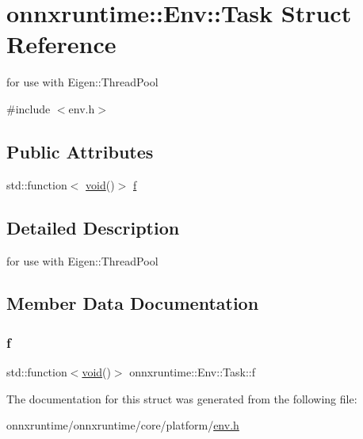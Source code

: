 \hypertarget{structonnxruntime_1_1Env_1_1Task}{}\section{onnxruntime\+:\+:Env\+:\+:Task Struct Reference}
\label{structonnxruntime_1_1Env_1_1Task}


for use with Eigen\+::\+Thread\+Pool  




{\ttfamily \#include $<$env.\+h$>$}

\subsection*{Public Attributes}
\begin{DoxyCompactItemize}
\item 
std\+::function$<$ \mbox{\hyperlink{mlasi_8h_a88f941d423cb2a819b70a1358982b1a6}{void}}()$>$ \mbox{\hyperlink{structonnxruntime_1_1Env_1_1Task_a78dc06820ea629efa348fff0d07c40b1}{f}}
\end{DoxyCompactItemize}


\subsection{Detailed Description}
for use with Eigen\+::\+Thread\+Pool 

\subsection{Member Data Documentation}
\mbox{\label{structonnxruntime_1_1Env_1_1Task_a78dc06820ea629efa348fff0d07c40b1}} 
\subsubsection{\texorpdfstring{f}{f}}
{\footnotesize\ttfamily std\+::function$<$\mbox{\hyperlink{mlasi_8h_a88f941d423cb2a819b70a1358982b1a6}{void}}()$>$ onnxruntime\+::\+Env\+::\+Task\+::f}



The documentation for this struct was generated from the following file\+:\begin{DoxyCompactItemize}
\item 
onnxruntime/onnxruntime/core/platform/\mbox{\hyperlink{env_8h}{env.\+h}}\end{DoxyCompactItemize}
